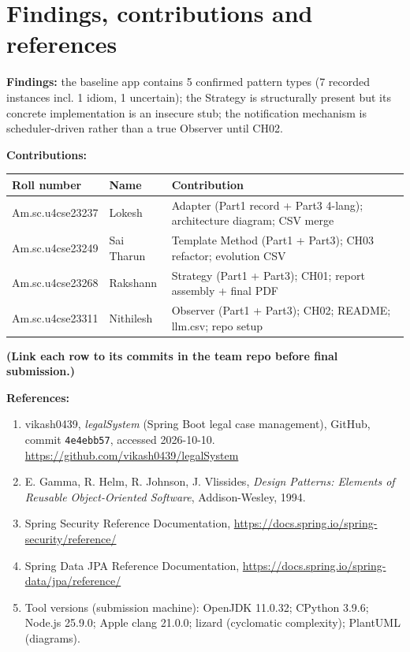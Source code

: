 \documentclass[11pt,a4paper]{article}
\begin{document}
\section{Findings, contributions and references}
\textbf{Findings:} the baseline app contains 5 confirmed pattern types (7 recorded instances incl. 1 idiom, 1 uncertain); the Strategy is structurally present but its concrete implementation is an insecure stub; the notification mechanism is scheduler-driven rather than a true Observer until CH02. \par
\textbf{Contributions:}\par
\begin{tabularx}{\linewidth}{@{}llX@{}}\toprule
Roll number & Name & Contribution\\\midrule
Am.sc.u4cse23237 & Lokesh & Adapter (Part1 record + Part3 4-lang); architecture diagram; CSV merge\\
Am.sc.u4cse23249 & Sai Tharun & Template Method (Part1 + Part3); CH03 refactor; evolution CSV\\
Am.sc.u4cse23268 & Rakshann & Strategy (Part1 + Part3); CH01; report assembly + final PDF\\
Am.sc.u4cse23311 & Nithilesh & Observer (Part1 + Part3); CH02; README; llm.csv; repo setup\\\bottomrule
\end{tabularx}
\textbf{(Link each row to its commits in the team repo before final submission.)}\par
\textbf{References:}\par
\begin{enumerate}
\item vikash0439, \emph{legalSystem} (Spring Boot legal case management), GitHub, commit \texttt{4e4ebb57}, accessed 2026-10-10. \url{https://github.com/vikash0439/legalSystem}
\item E. Gamma, R. Helm, R. Johnson, J. Vlissides, \emph{Design Patterns: Elements of Reusable Object-Oriented Software}, Addison-Wesley, 1994.
\item Spring Security Reference Documentation, \url{https://docs.spring.io/spring-security/reference/}
\item Spring Data JPA Reference Documentation, \url{https://docs.spring.io/spring-data/jpa/reference/}
\item Tool versions (submission machine): OpenJDK 11.0.32; CPython 3.9.6; Node.js 25.9.0; Apple clang 21.0.0; lizard (cyclomatic complexity); PlantUML (diagrams).
\end{enumerate}
\end{document}
